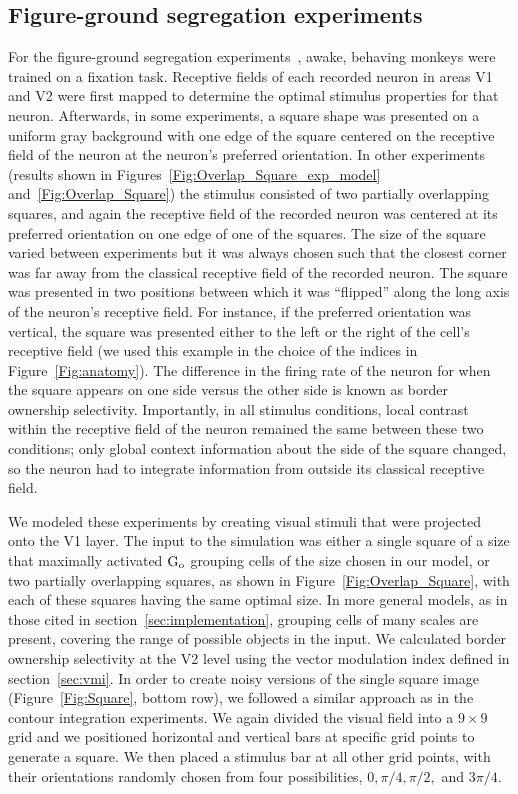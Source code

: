 {\subsection{Figure-ground segregation experiments} 
\label{sec:FGO}
For the figure-ground segregation experiments~\citep{Zhou_etal00,
  Qiu_etal07, Zhang_vonderHeydt10},
 awake, behaving monkeys were trained on a fixation task. 
Receptive fields of each recorded 
neuron in areas V1 and
V2 were first mapped to determine the optimal stimulus properties for
that neuron. Afterwards, 
in some experiments, 
a square shape was presented on a uniform
gray background with one edge of the square centered on the receptive
field of the neuron at the neuron's preferred orientation.  
In other
experiments (results shown in
Figures~\ref{Fig:Overlap_Square_exp_model} and~\ref{Fig:Overlap_Square})
the stimulus consisted of two 
partially overlapping squares, and again the receptive field of the
recorded neuron was centered at its preferred orientation on one edge
of one of the squares.  
The size of the square varied between experiments but it was always chosen such
that the closest corner was far away from the classical receptive
field of the recorded neuron. The square was presented in two
positions between which it was ``flipped'' along the long axis of the
neuron's receptive field. For instance, if the preferred orientation
was vertical, the square was presented either to the left or the right
of the cell's receptive field (we used this example in the choice of
the indices in Figure~\ref{Fig:anatomy}).  The difference in the
firing rate of the neuron for when the square appears on one side
versus the other side is known as border ownership
selectivity. Importantly, in all stimulus conditions, local contrast
within the receptive field of the neuron remained the same between
these two conditions; only global context information about the side
of the square changed, so the neuron had to integrate information from
outside its classical receptive field.

We modeled these experiments by creating visual stimuli that were
projected onto the V1 layer. The input to the simulation was 
either a single square of a size that maximally activated $\rm G_o$ grouping cells of
the size chosen in our model,
or two partially overlapping squares, as shown in
Figure~\ref{Fig:Overlap_Square}, 
with each of these squares having the same
optimal size. 
In more general models, as in those
cited in section~\ref{sec:implementation}, grouping cells of many
scales are present, covering the range of possible objects in the
input. We calculated border ownership selectivity at the V2 level
using the vector modulation index defined in section~\ref{sec:vmi}.
In order to create noisy versions of the
single
square image
(Figure~\ref{Fig:Square}, bottom row),
 we followed a
similar approach as in the contour integration experiments.  We again
divided the visual field into a $9 \times 9$ grid and we positioned
horizontal and vertical bars at specific grid points to generate a
square. We then placed a stimulus bar at all other grid points, with
their orientations randomly chosen from four possibilities,
$0, \pi/4, \pi/2,$ and $3\pi/4$.

}
